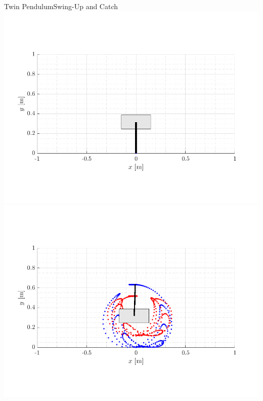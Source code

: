 \begin{frame}{Twin Pendulum}{Swing-Up and Catch}
  {
    \vspace{-.3cm}
    \includegraphics[width=1\textwidth]{figures/twinPendulumAni/ani-0}
  }
  {
    \vspace{-.3cm}
  }
  {
    \vspace{-.3cm}
    \includegraphics[width=1\textwidth]{figures/twinPendulumAni/ani-148}
  }
\end{frame}


